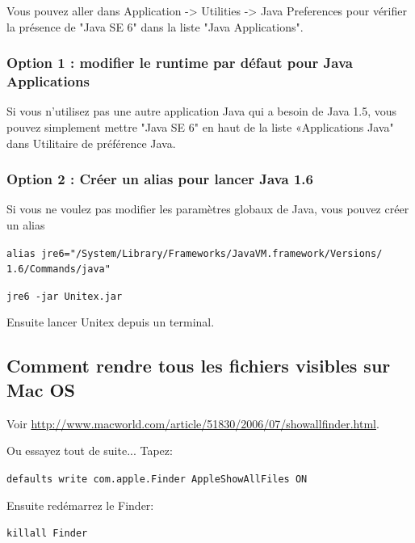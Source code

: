 \noindent Vous pouvez aller dans Application -> Utilities -> Java Preferences pour vérifier la présence  de "Java SE 6" dans la liste "Java Applications".


\subsubsection{Option 1 : modifier le runtime par défaut pour Java Applications}
\noindent Si vous n'utilisez pas une autre application Java qui a besoin de Java 1.5, vous pouvez
simplement mettre "Java SE 6" en haut de la liste «Applications Java" dans Utilitaire de préférence
Java.
\subsubsection{Option 2 : Créer un alias pour lancer Java 1.6}
\noindent Si vous ne voulez pas modifier les paramètres globaux de Java, vous pouvez créer un alias

\bigskip
\noindent \verb+alias jre6="/System/Library/Frameworks/JavaVM.framework/Versions/+
\noindent \verb+1.6/Commands/java"+
   
\bigskip
\noindent \verb+jre6 -jar Unitex.jar+

\bigskip
\noindent Ensuite lancer Unitex depuis un terminal.




\subsection{Comment rendre tous les fichiers visibles sur Mac OS}
\noindent Voir
\url{http://www.macworld.com/article/51830/2006/07/showallfinder.html}.

\bigskip
\noindent Ou essayez tout de suite... Tapez: 

\bigskip
\verb+defaults write com.apple.Finder AppleShowAllFiles ON+

\bigskip
\noindent Ensuite redémarrez le Finder:

\bigskip
\verb+killall Finder+


